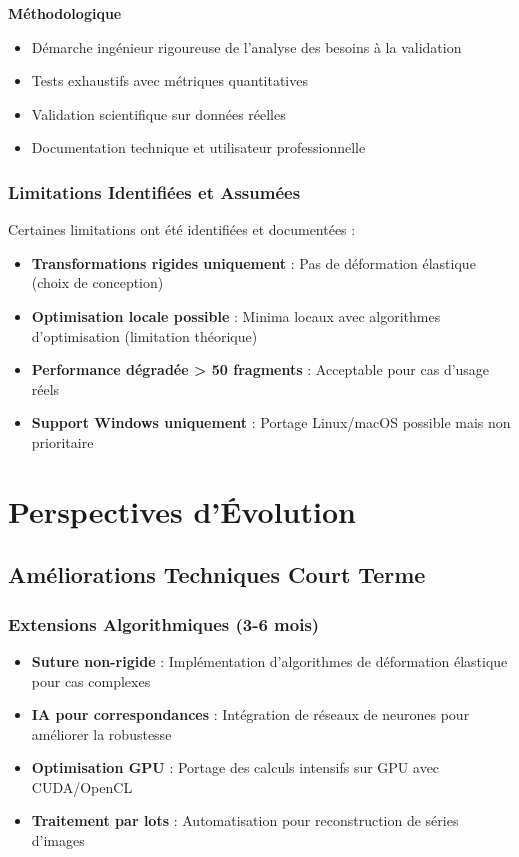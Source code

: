 \documentclass[12pt,a4paper]{report}
\begin{document}
\textbf{Méthodologique}
\begin{itemize}
\item Démarche ingénieur rigoureuse de l'analyse des besoins à la validation
\item Tests exhaustifs avec métriques quantitatives
\item Validation scientifique sur données réelles
\item Documentation technique et utilisateur professionnelle
\end{itemize}

\subsubsection{Limitations Identifiées et Assumées}

Certaines limitations ont été identifiées et documentées :

\begin{itemize}
\item \textbf{Transformations rigides uniquement} : Pas de déformation élastique (choix de conception)
\item \textbf{Optimisation locale possible} : Minima locaux avec algorithmes d'optimisation (limitation théorique)
\item \textbf{Performance dégradée > 50 fragments} : Acceptable pour cas d'usage réels
\item \textbf{Support Windows uniquement} : Portage Linux/macOS possible mais non prioritaire
\end{itemize}

\section{Perspectives d'Évolution}

\subsection{Améliorations Techniques Court Terme}

\subsubsection{Extensions Algorithmiques (3-6 mois)}

\begin{itemize}
\item \textbf{Suture non-rigide} : Implémentation d'algorithmes de déformation élastique pour cas complexes
\item \textbf{IA pour correspondances} : Intégration de réseaux de neurones pour améliorer la robustesse
\item \textbf{Optimisation GPU} : Portage des calculs intensifs sur GPU avec CUDA/OpenCL
\item \textbf{Traitement par lots} : Automatisation pour reconstruction de séries d'images
\end{itemize}
\end{document}

